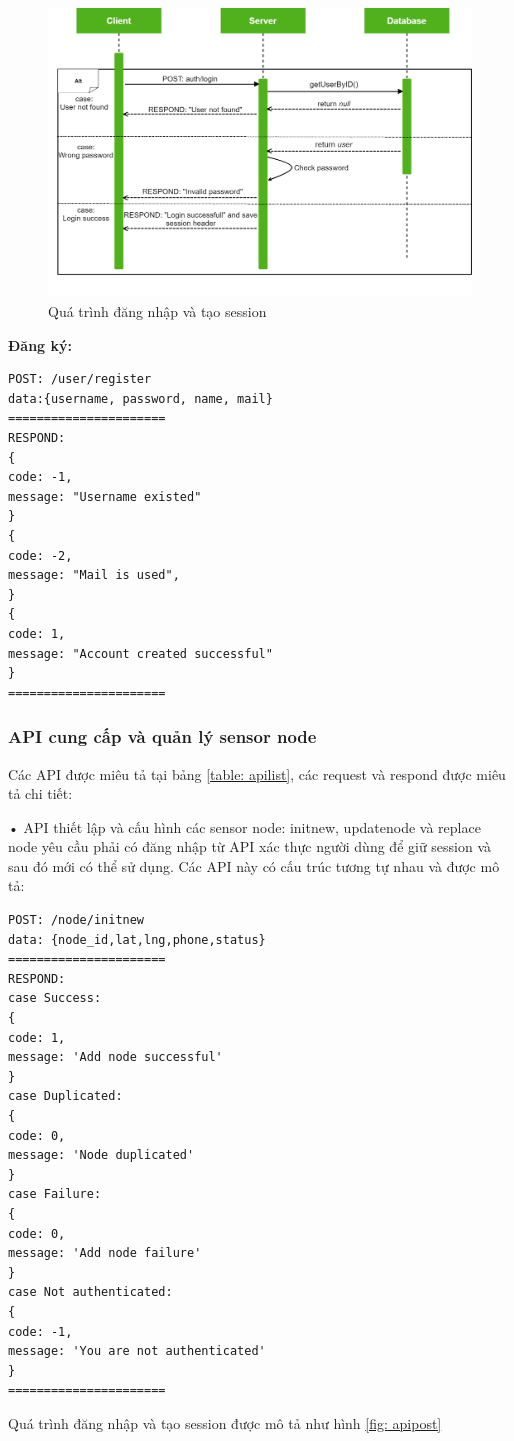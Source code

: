 \begin{figure}[H]
	\centering    
	\includegraphics[width=1\textwidth]{apilogin}
	\caption[Quá trình đăng nhập và tạo session]{Quá trình đăng nhập và tạo session}
	\label{fig: apilogin}
\end{figure}


\textbf{Đăng ký:}

\begin{Verbatim}[xleftmargin=2em]
POST: /user/register
data:{username, password, name, mail}
======================	
RESPOND:
{
code: -1,
message: "Username existed"
}
{
code: -2,
message: "Mail is used",
}
{
code: 1,
message: "Account created successful"
}
======================	
\end{Verbatim}
\subsubsection*{API cung cấp và quản lý sensor node}
Các API được miêu tả tại bảng \ref{table: apilist}, các request và respond được miêu tả chi tiết:

• API thiết lập và cấu hình các sensor node: initnew, updatenode và replace node yêu cầu phải có đăng nhập từ API xác thực người dùng để giữ session và sau đó mới có thể sử dụng. Các API này có cấu trúc tương tự nhau và được mô tả:
\begin{Verbatim}[xleftmargin=2em]
POST: /node/initnew
data: {node_id,lat,lng,phone,status}
======================
RESPOND:
case Success:
{
code: 1,
message: 'Add node successful'
}
case Duplicated:
{
code: 0,
message: 'Node duplicated'
}
case Failure:
{
code: 0,
message: 'Add node failure'
}
case Not authenticated:
{
code: -1,
message: 'You are not authenticated'
}
======================	

\end{Verbatim}
Quá trình đăng nhập và tạo session được mô tả như hình \ref{fig: apipost}

